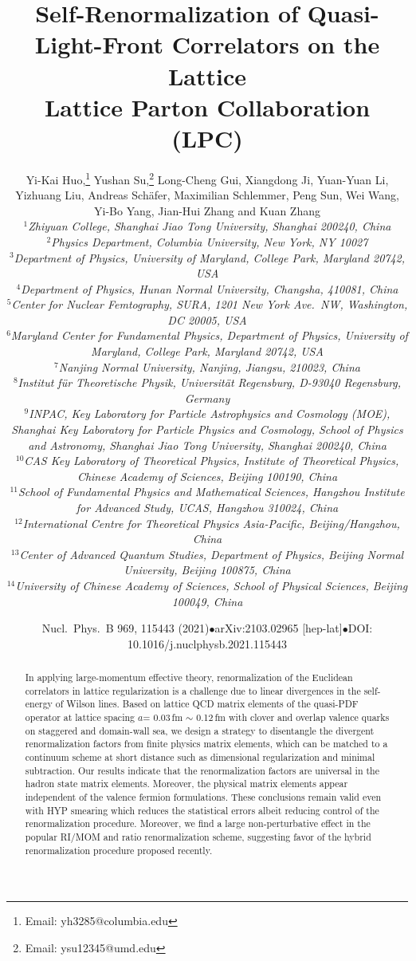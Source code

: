 \documentclass[11pt]{article}
\title{\bf Self-Renormalization of Quasi-Light-Front Correlators on the Lattice\\[1ex]
\large Lattice Parton Collaboration (LPC)}
\author{Yi-Kai Huo,\thanks{Email: yh3285@columbia.edu}
Yushan Su,\thanks{Email: ysu12345@umd.edu}
Long-Cheng Gui,
Xiangdong Ji,
Yuan-Yuan Li,
Yizhuang Liu,
Andreas Sch\"afer,
Maximilian Schlemmer,
Peng Sun,
Wei Wang,
Yi-Bo Yang,
Jian-Hui Zhang and
Kuan Zhang\\[1ex]
\normalsize\it
$^{1}$Zhiyuan College, Shanghai Jiao Tong University, Shanghai 200240, China\\
$^{2}$Physics Department, Columbia University, New York, NY 10027\\
$^{3}$Department of Physics, University of Maryland, College Park, Maryland 20742, USA\\
$^{4}$Department of Physics, Hunan Normal University, Changsha, 410081, China\\
$^{5}$Center for Nuclear Femtography, SURA, 1201 New York Ave.\ NW, Washington, DC 20005, USA\\
$^{6}$Maryland Center for Fundamental Physics, Department of Physics, University of Maryland, College Park, Maryland 20742, USA\\
$^{7}$Nanjing Normal University, Nanjing, Jiangsu, 210023, China\\
$^{8}$Institut f\"ur Theoretische Physik, Universit\"at Regensburg, D-93040 Regensburg, Germany\\
$^{9}$INPAC, Key Laboratory for Particle Astrophysics and Cosmology (MOE), Shanghai Key Laboratory for Particle Physics and Cosmology, School of Physics and Astronomy, Shanghai Jiao Tong University, Shanghai 200240, China\\
$^{10}$CAS Key Laboratory of Theoretical Physics, Institute of Theoretical Physics, Chinese Academy of Sciences, Beijing 100190, China\\
$^{11}$School of Fundamental Physics and Mathematical Sciences, Hangzhou Institute for Advanced Study, UCAS, Hangzhou 310024, China\\
$^{12}$International Centre for Theoretical Physics Asia-Pacific, Beijing/Hangzhou, China\\
$^{13}$Center of Advanced Quantum Studies, Department of Physics, Beijing Normal University, Beijing 100875, China\\
$^{14}$University of Chinese Academy of Sciences, School of Physical Sciences, Beijing 100049, China}
\date{Nucl.\ Phys.\ B 969, 115443 (2021)\quad $\bullet$\quad arXiv:2103.02965 [hep-lat]\quad $\bullet$\quad DOI: 10.1016/j.nuclphysb.2021.115443}
\begin{document}
\begin{abstract}
In applying large-momentum effective theory, renormalization of
the Euclidean correlators in lattice regularization is a challenge due to
linear divergences in the self-energy of Wilson lines.
Based on lattice QCD matrix elements of the quasi-PDF operator at lattice spacing $a$= 0.03\,fm $\sim$ 0.12\,fm with clover and overlap valence quarks on staggered and domain-wall sea, we design a strategy to disentangle the divergent renormalization factors from finite physics matrix elements, which can be matched to a continuum scheme at short distance such as dimensional regularization and minimal subtraction. Our results
indicate that the renormalization factors are universal in the hadron state matrix elements. Moreover, the physical matrix elements appear independent of the valence fermion formulations.
These conclusions remain valid even with HYP smearing which reduces the statistical errors albeit reducing control of the renormalization procedure.
Moreover, we find a large non-perturbative effect in the popular RI/MOM and
ratio renormalization scheme, suggesting favor of the hybrid renormalization procedure proposed recently.
\end{abstract}

\maketitle











\end{document}
